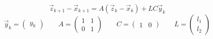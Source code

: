\documentclass{article}
\begin{document}
\thispagestyle{empty}

$$
\vec{z}_{k+1}-\vec{x}_{k+1} = A(\vec{z}_k-\vec{x}_k) + LC \vec{y}_k
$$
$$
\vec{y}_k=\begin{pmatrix}y_k\end{pmatrix}\qquad A=\begin{pmatrix} 1 & 1 \\ 0 & 1\end{pmatrix} \qquad C=\begin{pmatrix}1 & 0\end{pmatrix} \qquad L=\begin{pmatrix}l_1 \\ l_2\end{pmatrix}
$$
\end{document}
